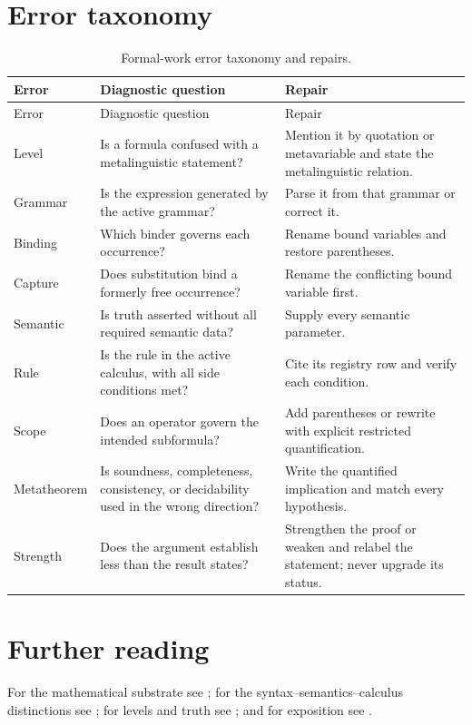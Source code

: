 \section{Error taxonomy}
\label{sec:p01-error-taxonomy}

\begingroup\small
\begin{longtable}{@{}p{}p{}p{}@{}}
\caption{Formal-work error taxonomy and repairs.}
\label{tab:p01-error-taxonomy}\\
\toprule
Error & Diagnostic question & Repair \\
\midrule
\endfirsthead
\toprule
Error & Diagnostic question & Repair \\
\midrule
\endhead
Level & Is a formula confused with a metalinguistic statement? & Mention it
by quotation or metavariable and state the metalinguistic relation. \\
Grammar & Is the expression generated by the active grammar? & Parse it from
that grammar or correct it. \\
Binding & Which binder governs each occurrence? & Rename bound variables and
restore parentheses. \\
Capture & Does substitution bind a formerly free occurrence? & Rename the
conflicting bound variable first. \\
Semantic & Is truth asserted without all required semantic data? & Supply
every semantic parameter. \\
Rule & Is the rule in the active calculus, with all side conditions met? &
Cite its registry row and verify each condition. \\
Scope & Does an operator govern the intended subformula? & Add parentheses or
rewrite with explicit restricted quantification. \\
Metatheorem & Is soundness, completeness, consistency, or decidability used in
the wrong direction? & Write the quantified implication and match every
hypothesis. \\
Strength & Does the argument establish less than the result states? &
Strengthen the proof or weaken and relabel the statement; never upgrade its
status. \\
\bottomrule
\end{longtable}
\endgroup

\section{Further reading}
\label{sec:p01-further-reading}

For the mathematical substrate see \cite{Jech2003}; for the
syntax--semantics--calculus distinctions see
\cite{Enderton2001,EbbinghausFlumThomas1994,OpenLogic2026}; for levels and
truth see \cite{Tarski1983}; and for exposition see
\cite{Halmos1970,KnuthLarrabeeRoberts1989,AMSAuthorHandbook}.
